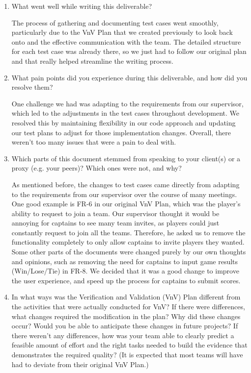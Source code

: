 \documentclass[12pt, titlepage]{article}
\begin{document}
\begin{enumerate}
  \item What went well while writing this deliverable?
  
  The process of gathering and documenting test cases went smoothly, particularly due to the VnV Plan that we created previously to look back onto and the effective communication with the team. The detailed structure for each test case was already there, so we just had to follow our original plan and that really helped streamline the writing process.
  
  \item What pain points did you experience during this deliverable, and how
    did you resolve them?
    
    One challenge we had was adapting to the requirements from our supervisor, which led to the adjustments in the test cases throughout development. We resolved this by maintaining flexibility in our code approach and updating our test plans to adjust for those implementation changes. Overall, there weren't too many issues that were a pain to deal with.
     
  \item Which parts of this document stemmed from speaking to your client(s) or
  a proxy (e.g. your peers)? Which ones were not, and why?
  
  As mentioned before, the changes to test cases came directly from adapting to the requirements from our supervisor over the course of many meetings. One good example is FR-6 in our original VnV Plan, which was the player's ability to request to join a team. Our supervisor thought it would be annoying for captains to see many team invites, as players could just constantly request to join all the teams. Therefore, he asked us to remove the functionality completely to only allow captains to invite players they wanted. Some other parts of the documents were changed purely by our own thoughts and opinions, such as removing the need for captains to input game results (Win/Lose/Tie) in FR-8. We decided that it was a good change to improve the user experience, and speed up the process for captains to submit scores.
  
  \item In what ways was the Verification and Validation (VnV) Plan different
  from the activities that were actually conducted for VnV?  If there were
  differences, what changes required the modification in the plan?  Why did
  these changes occur?  Would you be able to anticipate these changes in future
  projects?  If there weren't any differences, how was your team able to clearly
  predict a feasible amount of effort and the right tasks needed to build the
  evidence that demonstrates the required quality?  (It is expected that most
  teams will have had to deviate from their original VnV Plan.)
  

\end{enumerate}
\end{document}
